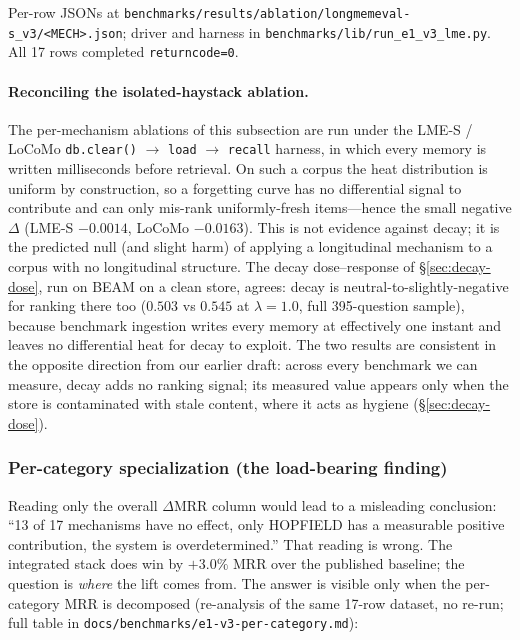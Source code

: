 \documentclass[11pt]{article}
\begin{document}
Per-row JSONs at
\texttt{benchmarks/results/ablation/longmemeval-s\_v3/<MECH>.json};
driver and harness in \texttt{benchmarks/lib/run\_e1\_v3\_lme.py}.
All 17 rows completed \texttt{returncode=0}.

\paragraph{Reconciling the isolated-haystack ablation.}
The per-mechanism ablations of this subsection are run under the
LME-S / LoCoMo \texttt{db.clear()} $\to$ \texttt{load} $\to$
\texttt{recall} harness, in which every memory is written
milliseconds before retrieval.  On such a corpus the heat
distribution is uniform by construction, so a forgetting curve has
no differential signal to contribute and can only mis-rank
uniformly-fresh items---hence the small negative $\Delta$ (LME-S
$-0.0014$, LoCoMo $-0.0163$).  This is not evidence against decay;
it is the predicted null (and slight harm) of applying a
longitudinal mechanism to a corpus with no longitudinal structure.
The decay dose--response of \S\ref{sec:decay-dose}, run on BEAM on a
clean store, agrees: decay is neutral-to-slightly-negative for
ranking there too ($0.503$ vs $0.545$ at $\lambda{=}1.0$, full
395-question sample), because benchmark ingestion writes every
memory at effectively one instant and leaves no differential heat
for decay to exploit.  The two results are consistent in the
opposite direction from our earlier draft: across every benchmark we
can measure, decay adds no ranking signal; its measured value
appears only when the store is contaminated with stale content,
where it acts as hygiene (\S\ref{sec:decay-dose}).

\subsubsection{Per-category specialization (the load-bearing finding)}
\label{sec:per-mech-category}

Reading only the overall $\Delta$MRR column would lead to a
misleading conclusion: ``13 of 17 mechanisms have no effect, only
HOPFIELD has a measurable positive contribution, the system is
overdetermined.''  That reading is wrong.  The integrated stack does
win by $+3.0\%$ MRR over the published baseline; the question is
\emph{where} the lift comes from.  The answer is visible only when
the per-category MRR is decomposed (re-analysis of the same 17-row
dataset, no re-run; full table in
\texttt{docs/benchmarks/e1-v3-per-category.md}):
\end{document}
